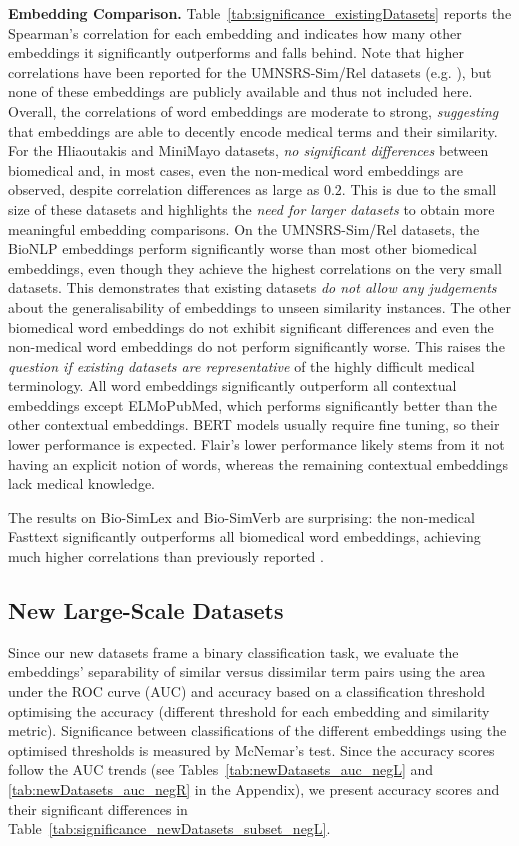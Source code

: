 \documentclass[letterpaper]{article} %
\begin{document}
\noindent\textbf{Embedding Comparison.} 
Table~\ref{tab:significance_existingDatasets} reports the Spearman's correlation for each embedding
 and indicates how many other embeddings it significantly outperforms and falls behind. 
Note that higher correlations have been reported for the UMNSRS-Sim/Rel datasets (e.g. \cite{LingEtAl2017,AbdeddaimVS2018}), but none of these embeddings are publicly available and thus not included here. 
Overall, the correlations of word embeddings are moderate to strong, \emph{suggesting} that embeddings are able to decently encode medical terms and their similarity.
For the Hliaoutakis and MiniMayo datasets,
\emph{no significant differences} between
biomedical and, in most cases, even the non-medical word embeddings are observed, despite correlation differences as large as $0.2$. 
This is due to the small size of these datasets and highlights the \emph{need for larger datasets} to obtain more meaningful embedding comparisons. 
On the UMNSRS-Sim/Rel datasets, the BioNLP embeddings perform significantly worse than most other biomedical embeddings, even though they achieve the highest correlations on the very small datasets.
This demonstrates that existing datasets \emph{do not allow any judgements} about the generalisability of embeddings to unseen similarity instances.
The other biomedical word embeddings do not exhibit significant differences and even the non-medical word embeddings do not perform significantly worse.
This raises the \emph{question if existing datasets are representative} of the highly difficult medical terminology.
All word embeddings significantly outperform
all contextual embeddings except ELMoPubMed, which performs significantly better than the other contextual embeddings. BERT models usually require fine tuning, so their lower performance is expected. Flair's lower performance likely stems from it not having an explicit notion of words, whereas the remaining contextual embeddings lack medical knowledge.

The results on Bio-SimLex and Bio-SimVerb are surprising: the non-medical Fasttext significantly outperforms all biomedical word embeddings, achieving much higher correlations  than previously reported \cite{ChiuPVK2018}.


\subsection{New Large-Scale Datasets}
Since our new datasets frame a binary classification task, we evaluate the embeddings' separability of similar versus dissimilar term pairs using the area under the ROC curve (AUC) and accuracy based on a classification threshold optimising the accuracy (different threshold for each embedding and similarity metric).
Significance between classifications of the different embeddings using the optimised thresholds is measured by McNemar's test.
Since the accuracy scores follow the AUC trends (see Tables~\ref{tab:newDatasets_auc_negL} and \ref{tab:newDatasets_auc_negR} in the Appendix), we present accuracy scores and their significant differences in Table~\ref{tab:significance_newDatasets_subset_negL}.
\end{document}
